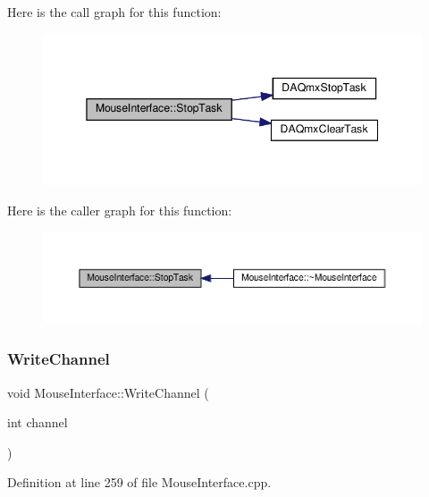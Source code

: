 Here is the call graph for this function\+:
\nopagebreak
\begin{figure}[H]
\begin{center}
\leavevmode
\includegraphics[width=345pt]{class_mouse_interface_a818fc677dc9766a611bb847fdbd9589e_cgraph}
\end{center}
\end{figure}
Here is the caller graph for this function\+:
\nopagebreak
\begin{figure}[H]
\begin{center}
\leavevmode
\includegraphics[width=350pt]{class_mouse_interface_a818fc677dc9766a611bb847fdbd9589e_icgraph}
\end{center}
\end{figure}
\mbox{\label{class_mouse_interface_a82af3fc9748aa565809317e6395f0696}} 
\subsubsection{\texorpdfstring{Write\+Channel}{WriteChannel}}
{\footnotesize\ttfamily void Mouse\+Interface\+::\+Write\+Channel (\begin{DoxyParamCaption}\item[{int}]{channel }\end{DoxyParamCaption})\hspace{0.3cm}{\ttfamily [slot]}}



Definition at line 259 of file Mouse\+Interface.\+cpp.

